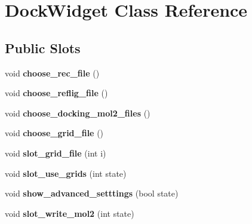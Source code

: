 \hypertarget{classDockWidget}{
\section{DockWidget Class Reference}
\label{classDockWidget}
}
\subsection*{Public Slots}
\begin{DoxyCompactItemize}
\item 
\hypertarget{classDockWidget_ab81dc50d24ab4d7225260e557b29a38a}{
void {\bfseries choose\_\-rec\_\-file} ()}
\label{classDockWidget_ab81dc50d24ab4d7225260e557b29a38a}

\item 
\hypertarget{classDockWidget_ac44fdcc7c01f47ccef574a387201f2b6}{
void {\bfseries choose\_\-reflig\_\-file} ()}
\label{classDockWidget_ac44fdcc7c01f47ccef574a387201f2b6}

\item 
\hypertarget{classDockWidget_a5729125af053928a500b1104c125eca5}{
void {\bfseries choose\_\-docking\_\-mol2\_\-files} ()}
\label{classDockWidget_a5729125af053928a500b1104c125eca5}

\item 
\hypertarget{classDockWidget_ac94ee4a1c18be279813955c6619da48d}{
void {\bfseries choose\_\-grid\_\-file} ()}
\label{classDockWidget_ac94ee4a1c18be279813955c6619da48d}

\item 
\hypertarget{classDockWidget_a849b615ee1480eaf4f7d63af5dc74ac8}{
void {\bfseries slot\_\-grid\_\-file} (int i)}
\label{classDockWidget_a849b615ee1480eaf4f7d63af5dc74ac8}

\item 
\hypertarget{classDockWidget_acfb973dac34eb4c7aa71620496058b9a}{
void {\bfseries slot\_\-use\_\-grids} (int state)}
\label{classDockWidget_acfb973dac34eb4c7aa71620496058b9a}

\item 
\hypertarget{classDockWidget_a83fd27eb089372ac6e4923ec6eee5862}{
void {\bfseries show\_\-advanced\_\-setttings} (bool state)}
\label{classDockWidget_a83fd27eb089372ac6e4923ec6eee5862}

\item 
\hypertarget{classDockWidget_ab03188fae0fa7b5d917f07e99d6cf6a0}{
void {\bfseries slot\_\-write\_\-mol2} (int state)}
\label{classDockWidget_ab03188fae0fa7b5d917f07e99d6cf6a0}


\end{DoxyCompactItemize}
